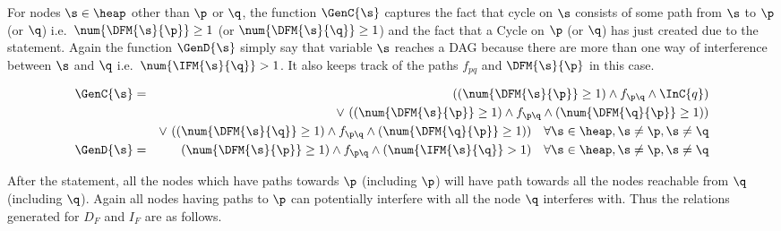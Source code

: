 \begin{enumerate}
For nodes $\s \in \heap$ other than $\p$ or $\q$, the function $\GenC{\s}$ 
captures the fact that cycle on $\s$ consists of some path from $\s$ to $\p$ (or $\q$) i.e.\ 
$\num{\DFM{\s}{\p}} \geq 1$ (or $\num{\DFM{\s}{\q}} \geq 1$)
and the fact that a Cycle on $\p$ (or $\q$) has just created due to the
statement. Again the function $\GenD{\s}$  simply say that variable $\s$ reaches a DAG
because there are more than one way of interference between $\s$ and $\q$ i.e.\ $\num{\IFM{\s}{\q}} > 1$. 
It also keeps track of the paths $f_{pq}$ and $\DFM{\s}{\p}$ in this case.

  \begin{eqnarray*}
    \GenC{\s} &=& \ \ \ \ ((\num{\DFM{\s}{\p}} \geq 1) \wedge f_{\p\q}
    \wedge \InC{q}) \\
    && \vee\ ((\num{\DFM{\s}{\p}} \geq 1) \wedge f_{\p\q} \wedge
    (\num{\DFM{\q}{\p}} \geq 1)) \\ 
    && \vee\ ((\num{\DFM{\s}{\q}} \geq 1) \wedge f_{\p\q}
    \wedge (\num{\DFM{\q}{\p}} \geq 1))  \quad 
    \forall \s \in \heap, \s \not= \p, \s \not=\q \\
    \GenD{\s}   &=& (\num{\DFM{\s}{\p}} \geq 1) \wedge
    f_{\p\q} \wedge (\num{\IFM{\s}{\q}} > 1) \quad 
    \forall \s \in \heap, \s \not= \p, \s \not=\q 
  \end{eqnarray*}

After the statement, all the nodes which have paths towards $\p$ (including $\p$) will have path towards 
all the nodes reachable from $\q$ (including $\q$). Again all nodes having paths to $\p$ can potentially interfere
with all the node $\q$ interferes with. Thus the relations generated for $D_F$ and $I_F$ are as follows. 


\end{enumerate}
